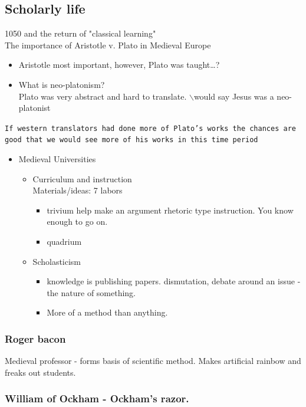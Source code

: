 \documentclass[11pt]{article}
\begin{document}
\subsection{Scholarly life}
\label{sec-7-5}
1050 and the return of "classical learning"\\
The importance of Aristotle v. Plato in Medieval Europe\\
\begin{itemize}
\item Aristotle most important, however, Plato was taught\ldots{}?\\
\item What is neo-platonism?\\
        Plato was very abstract and hard to translate.
$\backslash$\Some would say Jesus was a neo-platonist
\end{itemize}
\texttt{If western translators had done more of Plato's works the chances are good that we would see more of his works in this time period}
\begin{itemize}
\item Medieval Universities
\begin{itemize}
\item Curriculum and instruction\\
    Materials/ideas: 7 labors
\begin{itemize}
\item trivium help make an argument rhetoric type instruction. You know enough to go on.
\item quadrium
\end{itemize}
\item Scholasticism
\begin{itemize}
\item knowledge is publishing papers.
dismutation, debate around an issue - the nature of something.
\item More of a method than anything.
\end{itemize}
\end{itemize}
\end{itemize}

\subsubsection{Roger bacon}
\label{sec-7-5-1}
Medieval professor - forms basis of scientific method. Makes artificial rainbow and freaks out students.

\subsubsection{William of Ockham - Ockham's razor.}
\label{sec-7-5-2}
\end{document}
